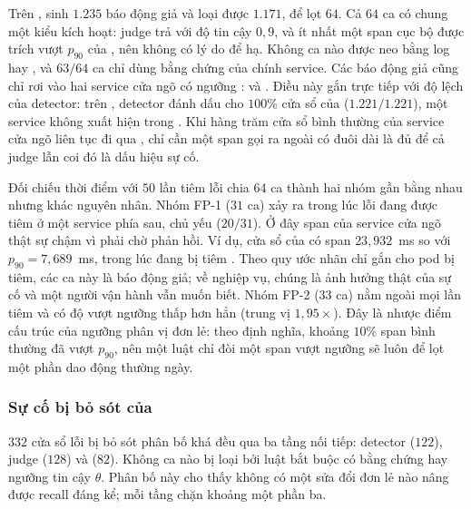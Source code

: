 Trên ,  sinh $1.235$ báo động giả và  loại được $1.171$, để lọt $64$. Cả $64$ ca có chung một kiểu kích hoạt: judge trả  với độ tin cậy $0{,}9$, và ít nhất một span cục bộ được trích vượt $p_{90}$ của , nên  không có lý do để hạ. Không ca nào được neo bằng log  hay , và $63/64$ ca chỉ dùng bằng chứng của chính service. %
Các báo động giả cũng chỉ rơi vào hai service cửa ngõ có ngưỡng :  và . Điều này gắn trực tiếp với độ lệch của detector: trên , detector đánh dấu  cho $100\%$ cửa sổ của  ($1.221/1.221$), một service không xuất hiện trong . %
Khi hàng trăm cửa sổ bình thường của service cửa ngõ liên tục đi qua , chỉ cần một span gọi ra ngoài có đuôi dài là đủ để cả judge lẫn  coi đó là dấu hiệu sự cố.

Đối chiếu thời điểm với $50$ lần tiêm lỗi chia $64$ ca thành hai nhóm gần bằng nhau nhưng khác nguyên nhân. Nhóm FP-1 ($31$ ca) xảy ra trong lúc lỗi đang được tiêm ở một service phía sau, chủ yếu  ($20/31$). Ở đây span của service cửa ngõ thật sự chậm vì phải chờ phản hồi. Ví dụ, cửa sổ  của  có span  $23{,}932$~ms so với $p_{90} = 7{,}689$~ms, trong lúc  đang bị tiêm . Theo quy ước nhãn chỉ gắn cho pod bị tiêm, các ca này là báo động giả; về nghiệp vụ, chúng là ảnh hưởng thật của sự cố và một người vận hành vẫn muốn biết. Nhóm FP-2 ($33$ ca) nằm ngoài mọi lần tiêm và có độ vượt ngưỡng thấp hơn hẳn (trung vị $1{,}95\times$). Đây là nhược điểm cấu trúc của ngưỡng phân vị đơn lẻ: theo định nghĩa, khoảng $10\%$ span bình thường đã vượt $p_{90}$, nên một luật chỉ đòi một span vượt ngưỡng sẽ luôn để lọt một phần dao động thường ngày.

\subsubsection{Sự cố bị bỏ sót của \CTAV{}}
\label{sec:ch7-fn}

$332$ cửa sổ lỗi bị bỏ sót phân bố khá đều qua ba tầng nối tiếp: detector ($122$), judge ($128$) và  ($82$). Không ca nào bị loại bởi luật bắt buộc có bằng chứng hay ngưỡng tin cậy $\theta$. Phân bố này cho thấy không có một sửa đổi đơn lẻ nào nâng được recall đáng kể; mỗi tầng chặn khoảng một phần ba.

